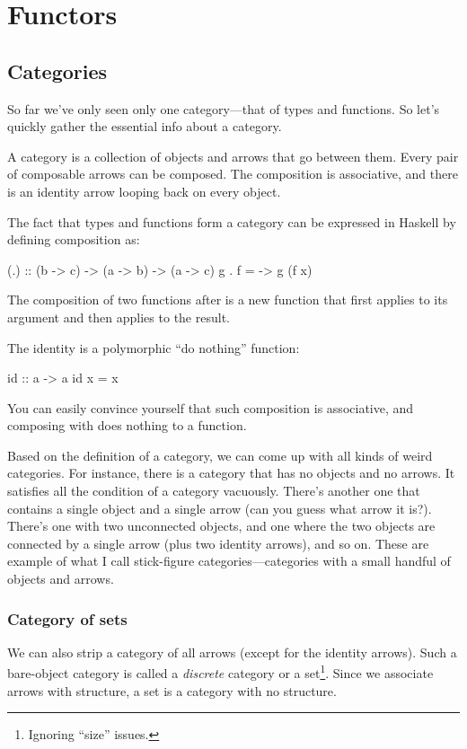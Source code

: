 \documentclass[DaoFP]{subfiles}
\begin{document}
\setcounter{chapter}{7}

\chapter{Functors}
\section{Categories}

So far we've only seen only one category---that of types and functions. So let's quickly gather the essential info about a category.

A category is a collection of objects and arrows that go between them. Every pair of composable arrows can be composed. The composition is associative, and there is an identity arrow looping back on every object.

The fact that types and functions form a category can be expressed in Haskell by defining composition as:
\begin{haskell}
(.) :: (b -> c) -> (a -> b) -> (a -> c)
g . f = \x -> g (f x)
\end{haskell}
The composition of two functions  after  is a new function that first applies  to its argument and then applies  to the result.

The identity is a polymorphic ``do nothing'' function:
\begin{haskell}
id :: a -> a
id x = x
\end{haskell}
You can easily convince yourself that such composition is associative, and composing with  does nothing to a function.

Based on the definition of a category, we can come up with all kinds of weird categories. For instance, there is a category that has no objects and no arrows. It satisfies all the condition of a category vacuously. There's another one that contains a single object and a single arrow (can you guess what arrow it is?). There's one with two unconnected objects, and one where the two objects are connected by a single arrow (plus two identity arrows), and so on. These are example of what I call stick-figure categories---categories with a small handful of objects and arrows.
\subsection{Category of sets}

We can also strip a category of all arrows (except for the identity arrows). Such a bare-object category is called a \emph{discrete} category or a set\footnote{Ignoring ``size'' issues.}. Since we associate arrows with structure, a set is a category with no structure. 
\end{document}
